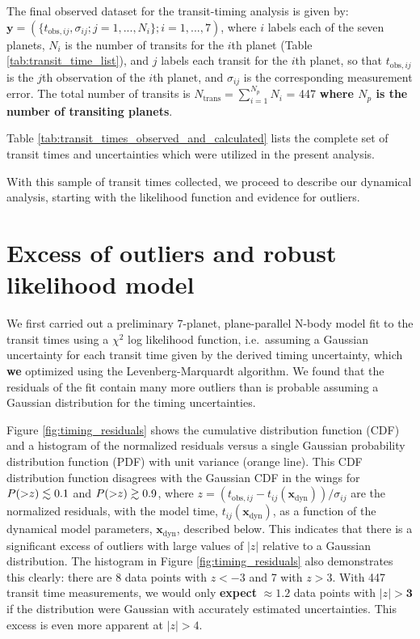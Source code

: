 \documentclass[twocolumn]{aastex63}
\begin{document}
The final observed dataset for the transit-timing analysis
is given by: $\mathbf{y} = (\{t_{\mathrm{obs},ij},\sigma_{ij}; j = 1,...,N_i\}; i=1,...,7)$, where $i$ labels each of the seven planets, $N_i$ is
the number of transits for the $i$th planet (Table \ref{tab:transit_time_list}),
and $j$ labels each transit for the $i$th planet, so that
$t_{\mathrm{obs},ij}$ is the $j$th observation of the $i$th planet, and
$\sigma_{ij}$ is the corresponding measurement error.  The total number of transits is $N_\mathrm{trans} = \sum_{i=1}^{N_p} N_i$ = 447 \textbf{where $N_p$ is the number of transiting planets}.

Table \ref{tab:transit_times_observed_and_calculated} lists the complete set
of transit times and uncertainties which were utilized in the present analysis.

With this sample of transit times collected, we proceed to describe our
dynamical analysis, starting with the likelihood function and evidence for outliers.

\section{Excess of outliers and robust likelihood model} \label{sec:outliers}

We first carried out a preliminary 7-planet, plane-parallel N-body model fit to the transit times using a $\chi^2$ log likelihood function, i.e.\ assuming a Gaussian uncertainty for each transit time given by the derived timing uncertainty, which \textbf{we} optimized using the Levenberg-Marquardt algorithm.
We found that the residuals of the fit contain many more outliers than is probable assuming
a Gaussian distribution for the timing uncertainties.

Figure \ref{fig:timing_residuals} shows the cumulative distribution
function (CDF)
and a histogram of the normalized residuals versus a single Gaussian
probability distribution function (PDF) with unit variance (orange line).
This CDF distribution function disagrees with the Gaussian CDF
in the wings for $P({>}z) \lesssim 0.1$ and $P({>}z) \gtrsim 0.9$,
where $z {=} (t_{\mathrm{obs},ij} {-} t_{ij}(\mathbf{x}_\mathrm{dyn}))/\sigma_{ij}$ are the normalized residuals, with the model time, $t_{ij}(\mathbf{x}_\mathrm{dyn})$, as a function of the dynamical model parameters, $\mathbf{x}_\mathrm{dyn}$, described below.
This indicates that there is a significant excess of outliers with
large values of $\vert z\vert$
relative to a Gaussian distribution.  The histogram in Figure
\ref{fig:timing_residuals} also demonstrates this clearly:  there
are 8 data points with $z {<} -3$ and 7 with $z {>} 3$.  With 447
transit time measurements, we would only \textbf{expect} $\approx 1.2$ data points
with $\vert z\vert {>} \mathbf{3}$ if the distribution were Gaussian with accurately estimated
uncertainties.  This excess is even more apparent at
$\vert z \vert {>} 4$. %
\end{document}
